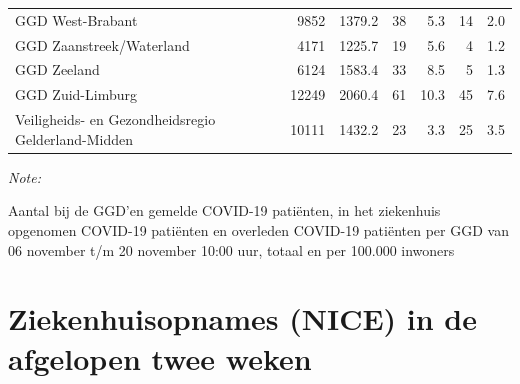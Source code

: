 \documentclass[
  english,
  man,floatsintext]{apa6}
\begin{document}
\begin{table}
\begin{threeparttable}
\begin{tabular}{lrrrrrr}
GGD West-Brabant & 9852 & 1379.2 & 38 & 5.3 & 14 & 2.0\\
GGD Zaanstreek/Waterland & 4171 & 1225.7 & 19 & 5.6 & 4 & 1.2\\
GGD Zeeland & 6124 & 1583.4 & 33 & 8.5 & 5 & 1.3\\
GGD Zuid-Limburg & 12249 & 2060.4 & 61 & 10.3 & 45 & 7.6\\
Veiligheids- en Gezondheidsregio Gelderland-Midden & 10111 & 1432.2 & 23 & 3.3 & 25 & 3.5\\
\bottomrule
\end{tabular}
\begin{tablenotes}
\item \textit{Note: } 
\item Aantal bij de GGD’en gemelde COVID-19 patiënten, in het ziekenhuis opgenomen COVID-19 patiënten en overleden COVID-19 patiënten per GGD van 06 november t/m 20 november 10:00 uur, totaal en per 100.000 inwoners
\end{tablenotes}
\end{threeparttable}
\endgroup{}
\end{table}

\newpage

\hypertarget{ziekenhuisopnames-nice-in-de-afgelopen-twee-weken}{%
\section{Ziekenhuisopnames (NICE) in de afgelopen twee weken}\label{ziekenhuisopnames-nice-in-de-afgelopen-twee-weken}}
\end{document}
